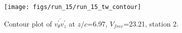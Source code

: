 \begin{figure}[H]
\centering
\texttt{[image: figs/run\_15/run\_15\_tw\_contour]}
\caption{Contour plot of $\overline{v_{\theta}^{\prime} v_{z}^{\prime}}$ at $z/c$=6.97, $V_{free}$=23.21, station 2.}
\label{fig:run_15_tw_contour}
\end{figure}


